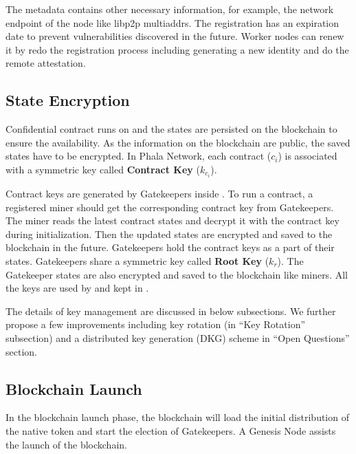 The metadata contains other necessary information, for example, the network endpoint of the node like libp2p multiaddrs. The registration has an expiration date to prevent vulnerabilities discovered in the future. Worker nodes can renew it by redo the registration process including generating a new identity and do the remote attestation.



\subsection{State Encryption}

Confidential contract runs on \pruntime and the states are persisted on the blockchain to ensure the availability. As the information on the blockchain are public, the saved states have to be encrypted. In Phala Network, each contract ($c_i$) is associated with a symmetric key called \textbf{Contract Key} ($k_{c_i}$).

Contract keys are generated by Gatekeepers inside \pruntime. To run a contract, a registered miner should get the corresponding contract key from Gatekeepers. The miner reads the latest contract states and decrypt it with the contract key during initialization. Then the updated states are encrypted and saved to the blockchain in the future. Gatekeepers hold the contract keys as a part of their states. Gatekeepers share a symmetric key called \textbf{Root Key} ($k_r$). The Gatekeeper states are also encrypted and saved to the blockchain like miners. All the keys are used by and kept in \pruntime.

The details of key management are discussed in below subsections. We further propose a few improvements including key rotation (in ``Key Rotation'' subsection) and a distributed key generation (DKG) scheme in ``Open Questions'' section.



\subsection{Blockchain Launch}

In the blockchain launch phase, the blockchain will load the initial distribution of the native token and start the election of Gatekeepers. A Genesis Node assists the launch of the blockchain.

